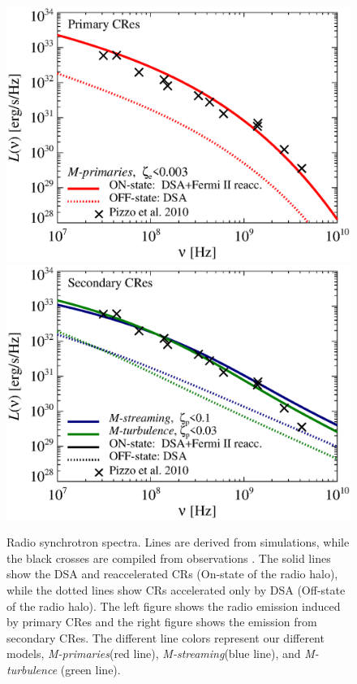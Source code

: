 \documentclass[a4paper,fleqn,usenatbib]{mnras}
\newcommand{\Mstream}{{\it M-streaming}\xspace}
\newcommand{\Mflatturb}{{\it M-turbulence}\xspace}
\newcommand{\Mprimary}{{\it M-primaries}\xspace}
\begin{document}
\begin{figure}
  \includegraphics[width=1.0\columnwidth]{sync.spec.pri.g72a.140.v6.eps}
  \includegraphics[width=1.0\columnwidth]{sync.spec.sec.g72a.140.v6.eps}
  \caption{Radio synchrotron spectra. Lines are derived from
    simulations, while the black crosses are compiled from
    observations \citet{2010PhDT.......259P}. The solid lines show the
    DSA and reaccelerated CRs (On-state of the radio halo), while the
    dotted lines show CRs accelerated only by DSA (Off-state of the
    radio halo). The left figure shows the radio emission induced by
    primary CRes and the right figure shows the emission from
    secondary CRes. The different line colors represent our different
    models, \Mprimary (red line), \Mstream (blue line), and \Mflatturb
    (green line).}
  \label{fig:sync_spectrum}
\end{figure}
\end{document}
